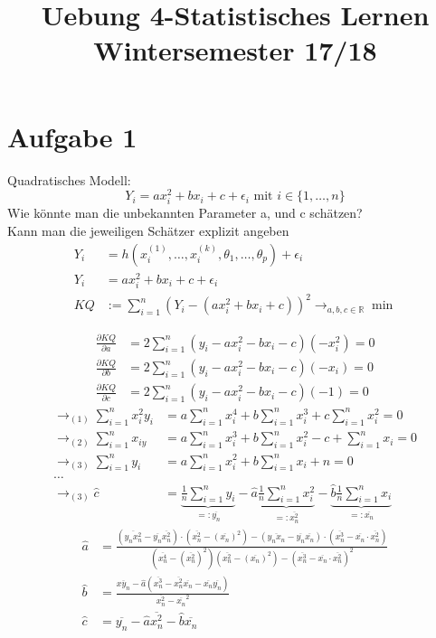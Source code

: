 \documentclass[10pt,a4paper]{article}
\title{Uebung 4-Statistisches Lernen\\ \large{Wintersemester 17/18}}
\date{}
\begin{document}
\maketitle
\section*{Aufgabe 1}
Quadratisches Modell:
\[
  Y_i = ax_i^2 + bx_i + c + \epsilon_i \text{   mit   } i\in \{1,\ldots, n\}
\]
Wie könnte man die unbekannten Parameter a, und c schätzen?\\
Kann man die jeweiligen Schätzer explizit angeben\\
\begin{align*}
  Y_i &= h (x_i^{(1)}, \ldots, x_i^{(k)}, \theta_1, \ldots, \theta_p)+ \epsilon_i\\
  Y_i &= ax_i^2 + bx_i + c + \epsilon_i\\
  KQ &:= \sum_{i=1}^{n}{(Y_i - (ax_i^2 + bx_i + c))}^2 \rightarrow_{a,b,c \in \mathbb{R}} \min
\end{align*}

\begin{align*}
  \frac{\partial KQ}{\partial a} &= 2 \sum_{i=1}^{n}(y_i - ax_i^2 - bx_i - c) (-x_i^2) = 0\\
  \frac{\partial KQ}{\partial b} &= 2 \sum_{i=1}^{n}(y_i - ax_i^2 - bx_i - c) (-x_i)= 0\\
  \frac{\partial KQ}{\partial c} &= 2 \sum_{i=1}^{n}(y_i - ax_i^2 - bx_i - c) (-1)= 0
\end{align*}
\begin{align*}
  \rightarrow_{(1)} \sum_{i=1}^{n} x_i^2y_i &=
  a \sum_{i=1}^{n} x_i^4 + b \sum_{i=1}^{n}x_i^3 + c\sum_{i=1}^{n}x_i^2 = 0\\
  \rightarrow_{(2)} \sum_{i=1}^{n} x_{iy} &=
  a \sum_{i=1}^{n} x_i^3 + b \sum_{i=1}^{n}x_i^2 - c + \sum_{i=1}^{n}x_i = 0\\
  \rightarrow_{(3)} \sum_{i=1}^{n}y_i &=
  a \sum_{i=1}^{n} x_i^2 + b \sum_{i=1}^{n}x_i + n  = 0\\
  \ldots\\
  \rightarrow_{(3)} \hat{c} &= \underbrace{\frac{1}{n}\sum_{i=1}^{n} y_i}_{=: \overline{y_n}} - \hat{a} \underbrace{\frac{1}{n} \sum_{i=1}^{n} x_i^2}_{=:\overline{x^2_n}}  - \underbrace{\hat{b} \frac{1}{n} \sum_{i=1}^{n}x_i}_{=:\overline{x_n}}
\end{align*}
\begin{align*}
  \hat{a} &= \frac{
    (\overline{y_n x_n^2} - \overline{y_n} \overline{x_n^2}) \cdot
    (\overline{x_n^2} - {(\overline{x_n})}^2) -
    (\overline{y_n x_n} - \overline{y_n} \overline{x_n}) \cdot
    (\overline{x_n^3} - \overline{x_n} \cdot \overline{x_n^2})
  }{
    (\overline{x_n^4} - {(\overline{x_n^2})}^2)
    (\overline{x_n^2} -{(\overline{x_n})}^2)-
    {(\overline{x_n^3} - \overline{x_n} \cdot \overline{x_n^2})}^2
  }\\
  \hat{b} &= \frac{
    \overline{xy_n} -
    \hat{a}(\overline{x^3_n} -\overline{x^2_n} \overline{x_n} -
    \overline{x_n} \overline{y_n})
  }{ \overline{x^2_n} - \overline{x_n}^2
  }\\
  \hat{c} &= \overline{y_n} - \hat{a} \overline{x^2_n} - \hat{b}\overline{x_n}\\
\end{align*}
\end{document}
